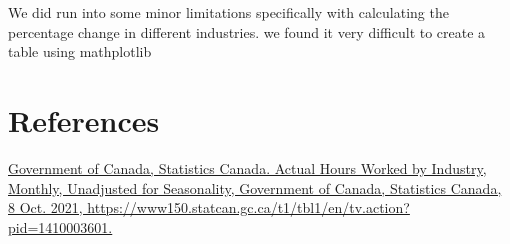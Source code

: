 \documentclass[fontsize=11pt]{article}
\begin{document}
We did run into some minor limitations specifically with calculating the percentage change in different industries. we found it very difficult to create a table using mathplotlib





\section{References}
 
\href{ https://www150.statcan.gc.ca/t1/tbl1/en/tv.action?pid=1410003601 }{ Government of Canada, Statistics Canada. Actual Hours Worked by Industry, Monthly, Unadjusted for Seasonality, Government of Canada, Statistics Canada, 8 Oct. 2021, https://www150.statcan.gc.ca/t1/tbl1/en/tv.action?pid=1410003601. } 

  
  
  
\end{document}
